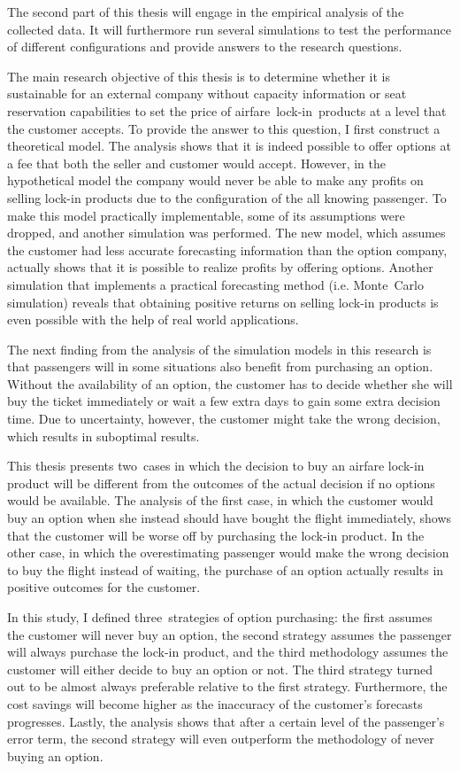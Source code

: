The second part of this thesis will engage in the empirical analysis of the collected data. It will furthermore run several simulations to test the performance of different configurations and provide answers to the research questions.

The main research objective of this thesis is to determine whether it is sustainable for an external company without capacity information or seat reservation capabilities to set the price of airfare~lock-in~products at a level that the customer accepts. To provide the answer to this question, I first construct a theoretical model. The analysis shows that it is indeed possible to offer options at a fee that both the seller and customer would accept. However, in the hypothetical model the company would never be able to make any profits on selling lock-in products due to the configuration of the all knowing passenger. To make this model practically implementable, some of its assumptions were dropped, and another simulation was performed. The new model, which assumes the customer had less accurate forecasting information than the option company, actually shows that it is possible to realize profits by offering options. Another simulation that implements a practical forecasting method (i.e. Monte~Carlo simulation) reveals that obtaining positive returns on selling lock-in products is even possible with the help of real world applications.

The next finding from the analysis of the simulation models in this research is that passengers will in some situations also benefit from purchasing an option. Without the availability of an option, the customer has to decide whether she will buy the ticket immediately or wait a few extra days to gain some extra decision time. Due to uncertainty, however, the customer might take the wrong decision, which results in suboptimal results.

This thesis presents two~cases in which the decision to buy an airfare lock-in product will be different from the outcomes of the actual decision if no options would be available. The analysis of the first case, in which the customer would buy an option when she instead should have bought the flight immediately, shows that the customer will be worse off by purchasing the lock-in product. In the other case, in which the overestimating passenger would make the wrong decision to buy the flight instead of waiting, the purchase of an option actually results in positive outcomes for the customer.

In this study, I defined three~strategies of option purchasing: the first assumes the customer will never buy an option, the second strategy assumes the passenger will always purchase the lock-in product, and the third methodology assumes the customer will either decide to buy an option or not. The third strategy turned out to be almost always preferable relative to the first strategy. Furthermore, the cost savings will become higher as the inaccuracy of the customer's forecasts progresses. Lastly, the analysis shows that after a certain level of the passenger's error term, the second strategy will even outperform the methodology of never buying an option.

